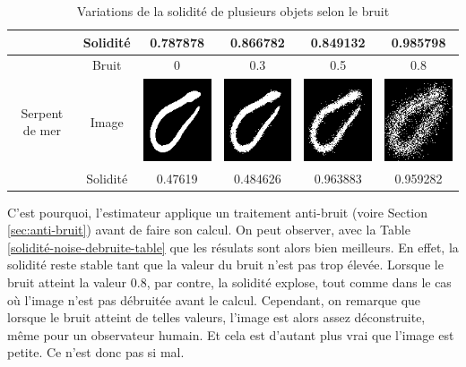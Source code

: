 \documentclass{article}
\theoremstyle{definition}
\begin{document}
\begin{table}[!h]
\begin{tabular}{|c|c|c|c|c|c|}
	    \cline{2-6}
	    & Solidité & 0.787878 & 0.866782 & 0.849132 & 0.985798 \\
	    \hline
	    \hline
	    & Bruit & 0 & 0.3 & 0.5 & 0.8 \\
	    \cline{2-6}
	    Serpent de mer & Image & \includegraphics[scale=0.3]{Illustrations/sea_snake-20.png} & \includegraphics[scale=0.3]{Illustrations/sea_snake-20(3).png} & \includegraphics[scale=0.3]{Illustrations/sea_snake-20(5).png} & \includegraphics[scale=0.3]{Illustrations/sea_snake-20(8).png} \\
	    \cline{2-6}
	    & Solidité & 0.47619 & 0.484626 & 0.963883 & 0.959282 \\
	    \hline	    
	  \end{tabular}
	  \caption{Variations de la solidité de plusieurs objets selon le bruit}
	  \label{solidité-noise-table}
	  \end{table}
	  
	  C'est pourquoi, l'estimateur applique un traitement anti-bruit (voire Section \ref{sec:anti-bruit}) avant de faire son calcul. On peut observer, avec la Table \ref{solidité-noise-debruite-table} que les résulats sont alors bien meilleurs. En effet, la solidité reste stable tant que la valeur du bruit n'est pas trop élevée. Lorsque le bruit atteint la valeur 0.8, par contre, la solidité explose, tout comme dans le cas où l'image n'est pas débruitée avant le calcul. Cependant, on remarque que lorsque le bruit atteint de telles valeurs, l'image est alors assez déconstruite, même pour un observateur humain. Et cela est d'autant plus vrai que l'image est petite. Ce n'est donc pas si mal. \\
	  
\end{document}
